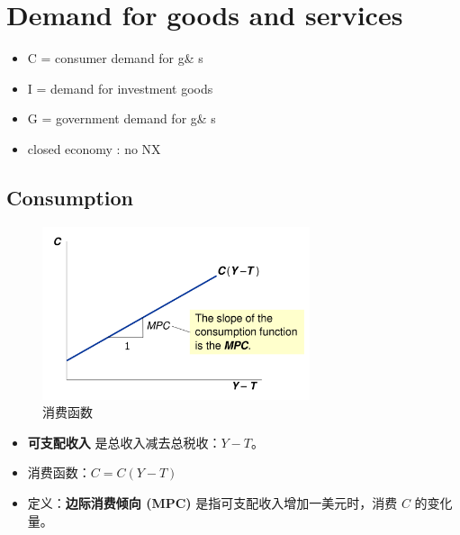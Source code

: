 \section{Demand for goods and services}

\begin{itemize}
    \item C = consumer demand for g\& s
    \item I = demand for investment goods
    \item G = government demand for g\& s
    \item closed economy : no NX
\end{itemize}

\newpage

\subsection{Consumption}
\begin{figure}[htbp]
    \centering
    \includegraphics[width=0.7\textwidth]{image/ConsumptionFunction.png}
    \caption{消费函数}
\end{figure}
\begin{itemize}
    \item \textbf{可支配收入} 是总收入减去总税收：$Y - T$。
    \item 消费函数：$C = C (Y - T )$
    \item 定义：\textbf{边际消费倾向 (MPC)} 是指可支配收入增加一美元时，消费 $C$ 的变化量。
\end{itemize}

